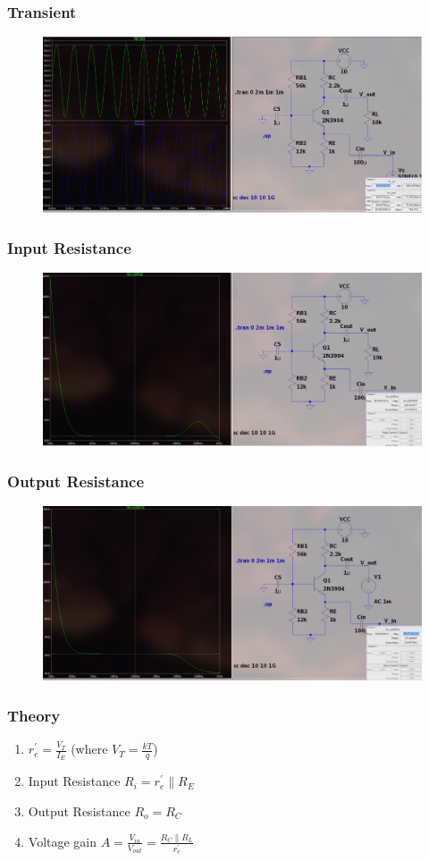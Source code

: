 \documentclass{article}
\begin{document}
\subsubsection{Transient}
\begin{figure}[h!]
        \centering
        \includegraphics[width=0.7\linewidth]{figs/bjt_cb_tr.png}
    \end{figure}
            \pagebreak
\subsubsection{Input Resistance}
\begin{figure}[h!]
        \centering
        \includegraphics[width=0.7\linewidth]{figs/bjt_cb_rin.png}
    \end{figure}
\subsubsection{Output Resistance}
\begin{figure}[h!]
        \centering
        \includegraphics[width=0.7\linewidth]{figs/bjt_cb_rout.png}
    \end{figure}

\subsubsection{Theory}
\begin{enumerate}
    \item $r_e^{\prime} = \frac{V_T}{I_E}$  (where $V_T = \frac{kT}{q}$) 
    \item Input Resistance $R_i = r_e^{\prime} \parallel R_{E} $
    \item Output Resistance $R_o = R_C $ 
    \item Voltage gain $A = \frac{V_{in}}{V_{out}} = \frac{R_C \parallel R_L}{r_e^{\prime}}$ 
\end{enumerate} 
\end{document}
